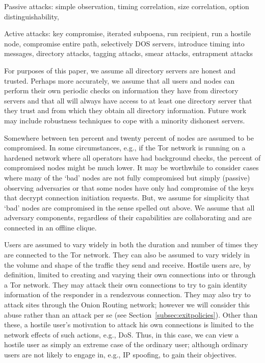 \documentclass[times,10pt,twocolumn]{article}
\begin{document}
Passive attacks:
simple observation,
timing correlation,
size correlation,
option distinguishability,

Active attacks:
key compromise,
iterated subpoena,
run recipient,
run a hostile node,
compromise entire path,
selectively DOS servers,
introduce timing into messages,
directory attacks,
tagging attacks,
smear attacks,
entrapment attacks



For purposes of this paper, we assume all directory servers are honest
and trusted. Perhaps more accurately, we assume that all users and
nodes can perform their own periodic checks on information they have
from directory servers and that all will always have access to at
least one directory server that they trust and from which they obtain
all directory information. Future work may include robustness
techniques to cope with a minority dishonest servers.

Somewhere between ten percent and twenty percent of nodes are assumed
to be compromised. In some circumstances, e.g., if the Tor network is
running on a hardened network where all operators have had
background checks, the percent of compromised nodes might be much
lower. It may be worthwhile to consider cases where many of the `bad'
nodes are not fully compromised but simply (passive) observing
adversaries or that some nodes have only had compromise of the keys
that decrypt connection initiation requests. But, we assume for
simplicity that `bad' nodes are compromised in the sense spelled out
above. We assume that all adversary components, regardless of their
capabilities are collaborating and are connected in an offline clique.

Users are assumed to vary widely in both the duration and number of
times they are connected to the Tor network. They can also be assumed
to vary widely in the volume and shape of the traffic they send and
receive. Hostile users are, by definition, limited to creating and
varying their own connections into or through a Tor network. They may
attack their own connections to try to gain identity information of
the responder in a rendezvous connection. They may also try to attack
sites through the Onion Routing network; however we will consider
this abuse rather than an attack per se (see
Section~\ref{subsec:exitpolicies}). Other than these, a hostile user's
motivation to attack his own connections is limited to the network
effects of such actions, e.g., DoS. Thus, in this case, we can view a
hostile user as simply an extreme case of the ordinary user; although
ordinary users are not likely to engage in, e.g., IP spoofing, to gain
their objectives.
\end{document}
